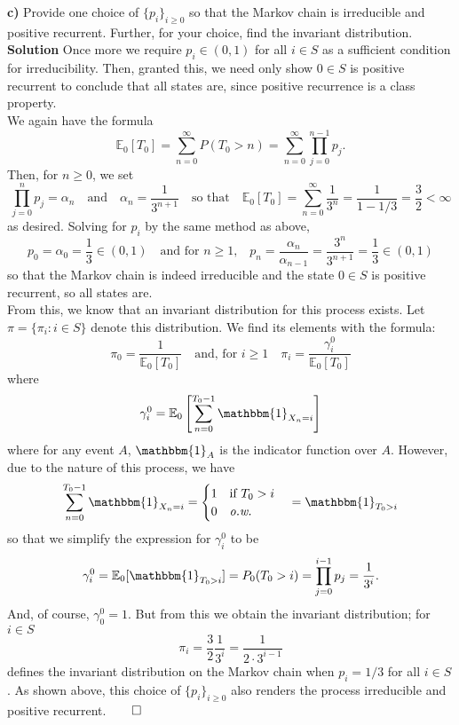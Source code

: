 \documentclass[11pt, letterpaper]{article}
\newcommand{\mbb}[1]{\mathbb{#1}}
\begin{document}
    {\bf c)} Provide one choice of $\{p_i\}_{i\geq 0}$ so that the Markov chain is irreducible and positive recurrent. Further, for your choice, find the invariant distribution.\\[10pt]
    {\bf Solution} Once more we require $p_i\in(0,1)$ for all $i\in S$ as a sufficient condition for irreducibility. Then, granted this, we need only show $0\in S$ is positive recurrent to conclude that all states are, since positive recurrence is a class property.\\[10pt]
    We again have the formula 
    \[\mbb{E}_0\left[T_0\right]=\sum_{n=0}^\infty P(T_0>n)=\sum_{n=0}^\infty\prod_{j=0}^{n-1}p_j.\]
    Then, for $n\geq 0$, we set
    \[\prod_{j=0}^np_j=\alpha_n\quad\text{and}\quad\alpha_{n}=\frac{1}{3^{n+1}}\quad\text{so that}\quad\mbb{E}_0\left[T_0\right]=\sum_{n=0}^\infty\frac{1}{3^n}=\frac{1}{1-1/3}=\frac{3}{2}<\infty\]
    as desired. Solving for $p_i$ by the same method as above,
    \[p_0=\alpha_0=\frac{1}{3}\in(0,1)\quad\text{and for $n\geq 1$,}\quad p_n=\frac{\alpha_n}{\alpha_{n-1}}=\frac{3^n}{3^{n+1}}=\frac{1}{3}\in(0,1)\]
    so that the Markov chain is indeed irreducible and the state $0\in S$ is positive recurrent, so all states are.\\[10pt]
    From this, we know that an invariant distribution for this process exists. Let $\pi=\{\pi_i:i\in S\}$ denote this distribution. We find its elements with the formula:
    \[\pi_0=\frac{1}{\mbb{E}_0[T_0]}\quad\text{and, for $i\geq 1$}\quad\pi_i=\frac{\gamma^0_i}{\mbb{E}_0[T_0]}\]
    where 
    \[\gamma^0_i=\mbb{E}_0\left[\sum_{n=0}^{T_0-1}\mathbbm{1}_{X_n=i}\right]\]
    where for any event $A$, $\mathbbm{1}_A$ is the indicator function over $A$. However, due to the nature of this process,  we have
    \[\sum_{n=0}^{T_0-1}\mathbbm{1}_{X_n=i}=\begin{cases}
        1\quad\text{if $T_0>i$}\\
        0\quad\text{{\it o.w.}}
    \end{cases}=\mathbbm{1}_{T_0>i}\]
    so that we simplify the expression for $\gamma^0_i$ to be
    \[\gamma^0_i=\mbb{E}_0[\mathbbm{1}_{T_0>i}]=P_0(T_0>i)=\prod_{j=0}^{i-1}p_j=\frac{1}{3^i}.\]
    And, of course, $\gamma_0^0=1$. But from this we obtain the invariant distribution; for $i\in S$
    \[\pi_i=\frac{3}{2}\frac{1}{3^i}=\frac{1}{2\cdot 3^{i-1}}\]
    defines the invariant distribution on the Markov chain when $p_i=1/3$ for all $i\in S$. As shown above, this choice of $\{p_i\}_{i\geq 0}$ also renders the process irreducible and positive recurrent.\hfill{$\qed$}\\[10pt]
\end{document}
